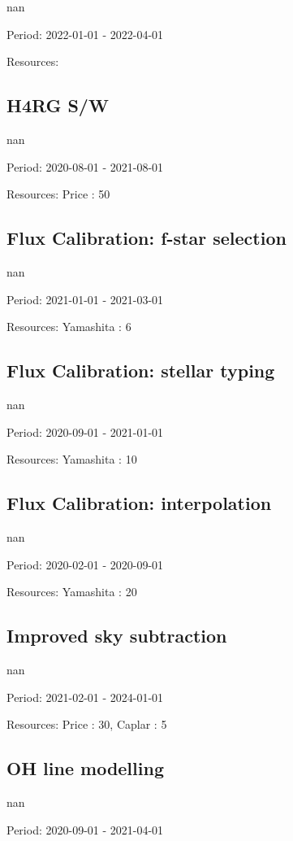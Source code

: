 nan

Period: 2022-01-01 - 2022-04-01

Resources: 

\subsection{H4RG S/W}

nan

Period: 2020-08-01 - 2021-08-01

Resources: Price : 50

\subsection{Flux Calibration: f-star selection}

nan

Period: 2021-01-01 - 2021-03-01

Resources: Yamashita : 6

\subsection{Flux Calibration: stellar typing}

nan

Period: 2020-09-01 - 2021-01-01

Resources: Yamashita : 10

\subsection{Flux Calibration: interpolation}

nan

Period: 2020-02-01 - 2020-09-01

Resources: Yamashita : 20

\subsection{Improved sky subtraction}

nan

Period: 2021-02-01 - 2024-01-01

Resources: Price : 30, Caplar : 5

\subsection{OH line modelling}

nan

Period: 2020-09-01 - 2021-04-01

